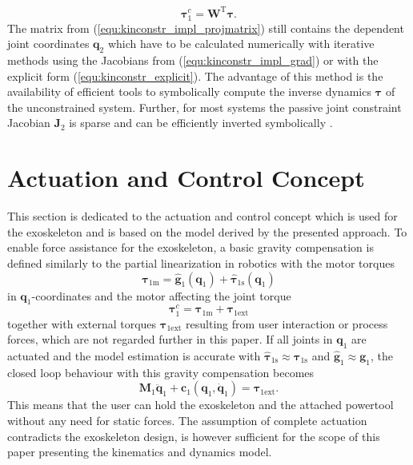 \documentclass[twocolumn,10pt]{IFTOMM}
\newcommand{\bm}[1]{\boldsymbol{#1}}
\newcommand{\transp}[0]{{\mathrm{T}}}
\begin{document}
%
\begin{equation}
\bm{\tau}^{c}_{1} = \bm{W}^\transp \bm{\tau}.
\label{equ:tau_projection}
\end{equation}
%
The matrix from (\ref{equ:kinconstr_impl_projmatrix}) still contains the dependent joint coordinates $\bm{q}_2$ which have to be calculated numerically with iterative methods using the Jacobians from (\ref{equ:kinconstr_impl_grad}) or with the explicit form (\ref{equ:kinconstr_explicit}).
The advantage of this method is the availability of efficient tools to symbolically compute the inverse dynamics $\bm{\tau}$ of the unconstrained system.
Further, for most systems the passive joint constraint Jacobian $\bm{J}_2$ is sparse and can be efficiently inverted symbolically \cite{ParkChoPlo1999}.

\section{Actuation and Control Concept}
\label{sec:actuation_control}

This section is dedicated to the actuation and control concept which is used for the exoskeleton and is based on the model derived by the presented approach.
To enable force assistance for the exoskeleton, a basic gravity compensation is defined similarly to the partial linearization in robotics with the motor torques
%
\begin{equation}
\bm{\tau}_{1\mathrm{m}} = \hat{\bm{g}}_1(\bm{q}_1) + \hat{\bm{\tau}}_{1\mathrm{s}}(\bm{q}_1)
\label{equ:GravKomp}
\end{equation}
%
in $\bm{q}_1$-coordinates and the motor affecting the joint torque
%
\begin{equation}
\bm{\tau}^c_1 = \bm{\tau}_{1\mathrm{m}} + \bm{\tau}_{1\mathrm{ext}}
\label{equ:JointTorque}
\end{equation}
%
together with external torques $\bm{\tau}_{1\mathrm{ext}}$ resulting from user interaction or process forces, which are not regarded further in this paper.
If all joints in $\bm{q}_1$ are actuated and the model estimation is accurate with $\hat{\bm{\tau}}_{1\mathrm{s}} \approx \bm{\tau}_{1\mathrm{s}}$ and $\hat{\bm{g}}_{1} \approx \bm{g}_{1}$, the closed loop behaviour with this gravity compensation becomes
%
\begin{equation}
\bm{M}_1\ddot{\bm{q}}_1+\bm{c}_1(\bm{q}_1,\dot{\bm{q}}_1) = \bm{\tau}_{1\mathrm{ext}}.
\label{equ:closedloop}
\end{equation}
%
This means that the user can hold the exoskeleton and the attached powertool without any need for static forces.
The assumption of complete actuation contradicts the exoskeleton design, is however sufficient for the scope of this paper presenting the kinematics and dynamics model.
\end{document}
